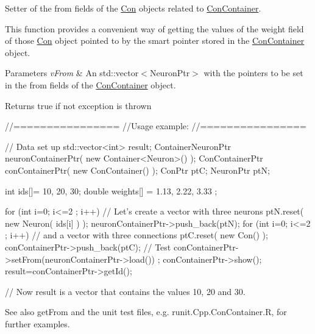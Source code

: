 Setter of the from fields of the \hyperlink{class_con}{Con} objects related to \hyperlink{class_con_container}{ConContainer}. 

This function provides a convenient way of getting the values of the weight field of those \hyperlink{class_con}{Con} object pointed to by the smart pointer stored in the \hyperlink{class_con_container}{ConContainer} object.


\begin{DoxyParams}{Parameters}
{\em vFrom} & An std::vector$<$NeuronPtr$>$ with the pointers to be set in the from fields of the \hyperlink{class_con_container}{ConContainer} object.\\
\hline
\end{DoxyParams}
\begin{DoxyReturn}{Returns}
true if not exception is thrown
\end{DoxyReturn}

\begin{DoxyCode}
        //================
        //Usage example:
        //================

        // Data set up
                std::vector<int> result;
                ContainerNeuronPtr      neuronContainerPtr( new 
      Container<Neuron>() );
                ConContainerPtr conContainerPtr( new ConContainer() );
                ConPtr  ptC;
                NeuronPtr ptN;

                int ids[]= {10, 20, 30};
                double weights[] = {1.13, 2.22, 3.33 };

                for (int i=0; i<=2 ; i++) {                             // Let's 
      create a vector with three neurons
                        ptN.reset( new Neuron( ids[i] ) );
                        neuronContainerPtr->push_back(ptN);
                }
                for (int i=0; i<=2 ; i++) {                             // and a 
      vector with three connections
                        ptC.reset( new Con() );
                        conContainerPtr->push_back(ptC);
                }
        // Test
                conContainerPtr->setFrom(neuronContainerPtr->load()) ;
                conContainerPtr->show();
                result=conContainerPtr->getId();

        // Now result is a vector that contains the values 10, 20 and 30.
\end{DoxyCode}


\begin{DoxySeeAlso}{See also}
getFrom and the unit test files, e.g. runit.Cpp.ConContainer.R, for further examples. 
\end{DoxySeeAlso}


